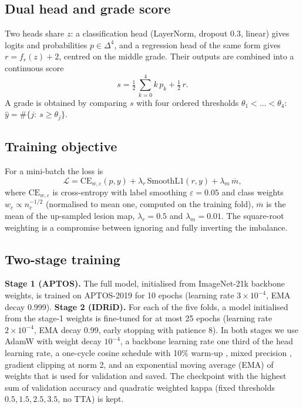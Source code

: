 \subsection{Dual head and grade score}
Two heads share $z$: a classification head (LayerNorm, dropout 0.3, linear) gives logits and probabilities
$p\in\Delta^{4}$, and a regression head of the same form gives $r = f_r(z) + 2$, centred on the middle grade.
Their outputs are combined into a continuous score
\begin{equation}
s = \tfrac12\,\textstyle\sum_{k=0}^{4} k\,p_k + \tfrac12\,r .
\label{eq:score}
\end{equation}
A grade is obtained by comparing $s$ with four ordered thresholds $\theta_1<\dots<\theta_4$:
$\hat y = \#\{j:\ s \geq \theta_j\}$.

\subsection{Training objective}
For a mini-batch the loss is
\begin{equation}
\mathcal{L} = \mathrm{CE}_{w,\varepsilon}(p, y) + \lambda_r\,\mathrm{SmoothL1}(r, y) + \lambda_m\,\overline{m},
\label{eq:loss}
\end{equation}
where $\mathrm{CE}_{w,\varepsilon}$ is cross-entropy with label smoothing $\varepsilon = 0.05$
\citep{szegedy2016rethinking} and class weights $w_c \propto n_c^{-1/2}$ (normalised to mean one, computed on the
training fold), $\overline m$ is the mean of the up-sampled lesion map, $\lambda_r = 0.5$ and $\lambda_m = 0.01$.
The square-root weighting is a compromise between ignoring and fully inverting the imbalance.

\subsection{Two-stage training}
\textbf{Stage 1 (APTOS).} The full model, initialised from ImageNet-21k backbone weights, is trained on APTOS-2019 for
10 epochs (learning rate $3\times10^{-4}$, EMA decay 0.999). \textbf{Stage 2 (IDRiD).} For each of the five folds, a
model initialised from the stage-1 weights is fine-tuned for at most 25 epochs (learning rate $2\times10^{-4}$, EMA
decay 0.99, early stopping with patience 8). In both stages we use AdamW \citep{loshchilov2019decoupled} with weight
decay $10^{-4}$, a backbone learning rate one third of the head learning rate, a one-cycle cosine schedule with 10\%
warm-up \citep{smith2019super}, mixed precision \citep{micikevicius2018mixed}, gradient clipping at norm 2, and an
exponential moving average (EMA) of weights \citep{polyak1992acceleration} that is used for validation and saved.
The checkpoint with the highest sum of validation accuracy and quadratic weighted kappa (fixed thresholds
$0.5,1.5,2.5,3.5$, no TTA) is kept.


